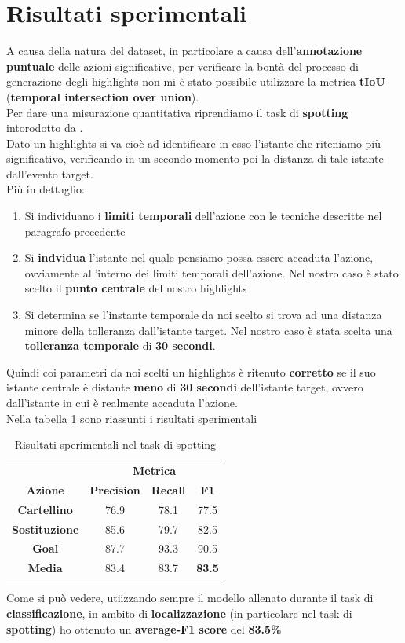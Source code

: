 \section{Risultati sperimentali}
A causa della natura del dataset, in particolare a causa dell'\textbf{annotazione puntuale} delle azioni significative, per verificare la bontà del processo di generazione degli highlights non mi è stato possibile utilizzare la metrica \textbf{tIoU} (\textbf{temporal intersection over union}).
\\Per dare una misurazione quantitativa riprendiamo il task di \textbf{spotting} intorodotto da \citet{soccerNet}.
\\Dato un highlights si va cioè ad identificare in esso l'istante che riteniamo più significativo, verificando in un secondo momento poi la distanza di tale istante dall'evento target.
\\Più in dettaglio:
\begin{enumerate}
\item Si individuano i \textbf{limiti temporali} dell'azione con le tecniche descritte nel paragrafo precedente
\item Si \textbf{indvidua} l'istante nel quale pensiamo possa essere accaduta l'azione, ovviamente all'interno dei limiti temporali dell'azione. Nel nostro caso è stato scelto il \textbf{punto centrale} del nostro highlights
\item Si determina se l'instante temporale da noi scelto si trova ad una distanza minore della tolleranza dall'istante target. Nel nostro caso è stata scelta una \textbf{tolleranza temporale} di \textbf{30 secondi}.
\end{enumerate}
Quindi coi parametri da noi scelti un highlights è ritenuto \textbf{corretto} se il suo istante centrale è distante \textbf{meno} di \textbf{30 secondi} dell'istante target, ovvero dall'istante in cui è realmente accaduta l'azione.
\\Nella tabella \ref{table: spotting-result} sono riassunti i risultati sperimentali
\begin{table}[ht]
\caption{Risultati sperimentali nel task di spotting}
\centering
\begin{tabular}{c| | c|c|c}
&\multicolumn{3}{c}{\textbf{Metrica}}\\
\textbf{Azione} & \textbf{Precision} & \textbf{Recall} & \textbf{F1}  \\
\hline
\textbf{Cartellino} & 76.9 & 78.1 & 77.5\\
\textbf{Sostituzione} & 85.6 & 79.7 & 82.5 \\
\textbf{Goal} & 87.7 &  93.3 & 90.5\\
\hline
\textbf{Media} & 83.4 & 83.7 & \textbf{83.5}\\ [1ex]

\end{tabular}
\label{table: spotting-result}
\end{table}

Come si può vedere, utiizzando sempre il modello allenato durante il task di \textbf{classificazione}, in ambito di \textbf{localizzazione} (in particolare nel task di \textbf{spotting}) ho ottenuto un \textbf{average-F1 score} del \textbf{83.5\%}